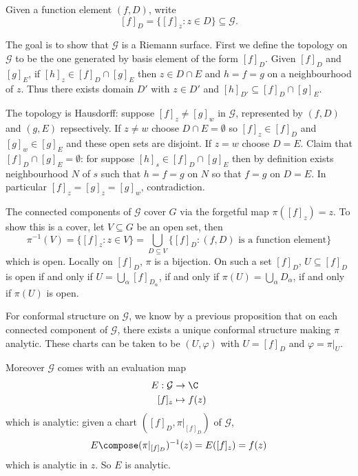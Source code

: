 \documentclass[a4paper]{article}
\begin{document}
\begin{notation}
  Given a function element \((f, D)\), write
  \[
    [f]_D = \{[f]_z: z \in D\} \subseteq \mathcal G.
  \]
\end{notation}

The goal is to show that \(\mathcal G\) is a Riemann surface. First we define the topology on \(\mathcal G\) to be the one generated  by basis element of the form \([f]_D\). Given \([f]_D\) and \([g]_E\), if \([h]_z \in [f]_D \cap [g]_E\) then \(z \in D \cap E\) and \(h = f = g\) on a neighbourhood of \(z\). Thus there exists domain \(D'\) with \(z \in D'\) and \([h]_{D'} \subseteq [f]_D \cap [g]_E\).

The topology is Hausdorff: suppose \([f]_z \neq [g]_w\) in \(\mathcal G\), represented by \((f, D)\) and \((g, E)\) repsectively. If \(z \neq w\) choose \(D \cap E = \emptyset\) so \([f]_z \in [f]_D\) and \([g]_w \in [g]_E\) and these open sets are disjoint. If \(z = w\) choose \(D = E\). Claim that \([f]_D \cap [g]_E = \emptyset\): for suppose \([h]_s \in [f]_D \cap [g]_E\) then by definition exists neighbourhood \(N\) of \(s\) such that \(h = f = g\) on \(N\) so that \(f = g\) on \(D = E\). In particular \([f]_z = [g]_z = [g]_w\), contradiction.

The connected components of \(\mathcal G\) cover \(G\) via the forgetful map \(\pi([f]_z) = z\). To show this is a cover, let \(V \subseteq G\) be an open set, then
\[
  \pi^{-1}(V) = \{[f]_z: z \in V\} = \bigcup_{D \subseteq V} \{[f]_D: (f, D) \text{ is a function element}\}
\]
which is open. Locally on \([f]_D\), \(\pi\) is a bijection. On such a set \([f]_D\), \(U \subseteq [f]_D\) is open if and only if \(U = \bigcup_\alpha [f]_{D_\alpha}\), if and only if \(\pi(U) = \bigcup_\alpha D_\alpha\), if and only if \(\pi(U)\) is open.

For conformal structure on \(\mathcal G\), we know by a previous proposition that on each connected component of \(\mathcal G\), there exists a unique conformal structure making \(\pi\) analytic. These charts can be taken to be \((U, \varphi)\) with \(U = [f]_D\) and \(\varphi = \pi|_U\).

Moreover \(\mathcal G\) comes with an evaluation map
\begin{align*}
  E: \mathcal G &\to \C \\
  [f]_z &\mapsto f(z)
\end{align*}
which is analytic: given a chart \(([f]_D, \pi|_{[f]_D})\) of \(\mathcal G\),
\[
  E \compose (\pi|_{[f]_D})^{-1}(z) = E([f]_z) = f(z)
\]
which is analytic in \(z\). So \(E\) is analytic.
\end{document}
